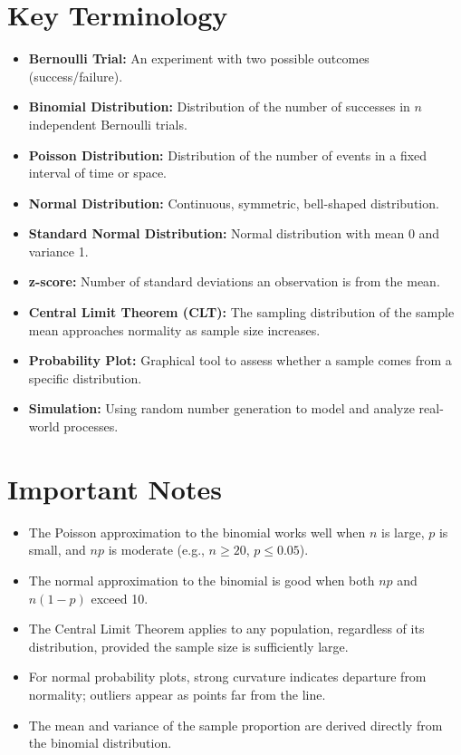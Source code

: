 \documentclass[11pt]{article}
\begin{document}
\section*{Key Terminology}
\begin{itemize}[nosep]
    \item \textbf{Bernoulli Trial:} An experiment with two possible outcomes (success/failure).
    \item \textbf{Binomial Distribution:} Distribution of the number of successes in \(n\) independent Bernoulli trials.
    \item \textbf{Poisson Distribution:} Distribution of the number of events in a fixed interval of time or space.
    \item \textbf{Normal Distribution:} Continuous, symmetric, bell-shaped distribution.
    \item \textbf{Standard Normal Distribution:} Normal distribution with mean 0 and variance 1.
    \item \textbf{z-score:} Number of standard deviations an observation is from the mean.
    \item \textbf{Central Limit Theorem (CLT):} The sampling distribution of the sample mean approaches normality as sample size increases.
    \item \textbf{Probability Plot:} Graphical tool to assess whether a sample comes from a specific distribution.
    \item \textbf{Simulation:} Using random number generation to model and analyze real-world processes.
\end{itemize}

\section*{Important Notes}
\begin{itemize}[nosep]
    \item The Poisson approximation to the binomial works well when \(n\) is large, \(p\) is small, and \(np\) is moderate (e.g., \(n \ge 20\), \(p \le 0.05\)).
    \item The normal approximation to the binomial is good when both \(np\) and \(n(1-p)\) exceed 10.
    \item The Central Limit Theorem applies to any population, regardless of its distribution, provided the sample size is sufficiently large.
    \item For normal probability plots, strong curvature indicates departure from normality; outliers appear as points far from the line.
    \item The mean and variance of the sample proportion are derived directly from the binomial distribution.
\end{itemize}
\end{document}
